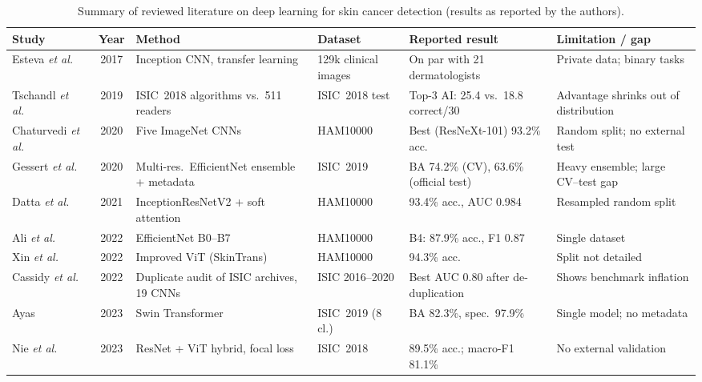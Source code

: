 \begin{table}[t]
\centering
\caption{Summary of reviewed literature on deep learning for skin cancer detection (results as reported by the authors).}
\label{tab:lit}
\renewcommand{\arraystretch}{1.15}
\scriptsize
\begin{tabularx}{\textwidth}{@{}L{2.4cm} c L{3.4cm} L{2.2cm} L{3.0cm} Y@{}}
\toprule
\textbf{Study} & \textbf{Year} & \textbf{Method} & \textbf{Dataset} & \textbf{Reported result} & \textbf{Limitation / gap} \\
\midrule
Esteva \emph{et al.}~\cite{esteva2017derm} & 2017 & Inception CNN, transfer learning & 129k clinical images & On par with 21 dermatologists & Private data; binary tasks \\
Tschandl \emph{et al.}~\cite{tschandl2019comparison} & 2019 & ISIC~2018 algorithms vs.\ 511 readers & ISIC~2018 test & Top-3 AI: 25.4 vs.\ 18.8 correct/30 & Advantage shrinks out of distribution \\
Chaturvedi \emph{et al.}~\cite{chaturvedi2020mtap} & 2020 & Five ImageNet CNNs & HAM10000 & Best (ResNeXt-101) 93.2\% acc. & Random split; no external test \\
Gessert \emph{et al.}~\cite{gessert2020} & 2020 & Multi-res.\ EfficientNet ensemble + metadata & ISIC~2019 & BA 74.2\% (CV), 63.6\% (official test) & Heavy ensemble; large CV--test gap \\
Datta \emph{et al.}~\cite{datta2021soft} & 2021 & InceptionResNetV2 + soft attention & HAM10000 & 93.4\% acc., AUC 0.984 & Resampled random split \\
Ali \emph{et al.}~\cite{ali2022efficientnets} & 2022 & EfficientNet B0--B7 & HAM10000 & B4: 87.9\% acc., F1 0.87 & Single dataset \\
Xin \emph{et al.}~\cite{xin2022skintrans} & 2022 & Improved ViT (SkinTrans) & HAM10000 & 94.3\% acc. & Split not detailed \\
Cassidy \emph{et al.}~\cite{cassidy2022isic} & 2022 & Duplicate audit of ISIC archives, 19 CNNs & ISIC 2016--2020 & Best AUC 0.80 after de-duplication & Shows benchmark inflation \\
Ayas~\cite{ayas2023swin} & 2023 & Swin Transformer & ISIC~2019 (8 cl.) & BA 82.3\%, spec.\ 97.9\% & Single model; no metadata \\
Nie \emph{et al.}~\cite{nie2023hybrid} & 2023 & ResNet + ViT hybrid, focal loss & ISIC~2018 & 89.5\% acc.; macro-F1 81.1\% & No external validation \\

\end{tabularx}
\end{table}
